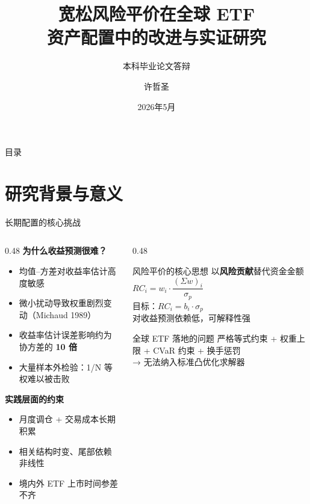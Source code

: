\documentclass[aspectratio=169,11pt]{beamer}
\title{宽松风险平价在全球 ETF\\资产配置中的改进与实证研究}
\subtitle{本科毕业论文答辩}
\author{许哲圣}
\date{2026年5月}
\begin{document}
\begin{frame}
  \titlepage
\end{frame}

\begin{frame}{目录}
  \tableofcontents
\end{frame}

\section{研究背景与意义}

\begin{frame}{长期配置的核心挑战}
  \begin{columns}[T]
    \begin{column}{0.48\textwidth}
      \textbf{为什么收益预测很难？}
      \begin{itemize}
        \item 均值–方差对收益率估计高度敏感
        \item 微小扰动导致权重剧烈变动（Michaud 1989）
        \item 收益率估计误差影响约为协方差的 \textbf{10 倍}
        \item 大量样本外检验：1/N 等权难以被击败
      \end{itemize}
      \vspace{0.5em}
      \textbf{实践层面的约束}
      \begin{itemize}
        \item 月度调仓 + 交易成本长期积累
        \item 相关结构时变、尾部依赖非线性
        \item 境内外 ETF 上市时间参差不齐
      \end{itemize}
    \end{column}
    \begin{column}{0.48\textwidth}
      \begin{block}{风险平价的核心思想}
        \centering
        以\textbf{风险贡献}替代资金金额\\[0.4em]
        \large
        $RC_i = w_i \cdot \dfrac{(\Sigma w)_i}{\sigma_p}$\\[0.6em]
        \normalsize
        目标：$RC_i = b_i \cdot \sigma_p$\\[0.4em]
        \small 对收益预测依赖低，可解释性强
      \end{block}
      \vspace{0.5em}
      \begin{alertblock}{全球 ETF 落地的问题}
        严格等式约束 + 权重上限 + CVaR 约束 + 换手惩罚\\
        → 无法纳入标准凸优化求解器
      \end{alertblock}
    \end{column}
  \end{columns}
\end{frame}
\end{document}
